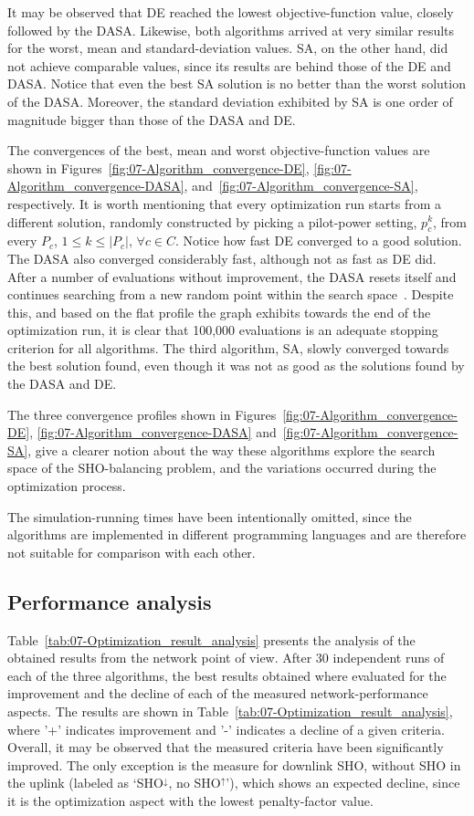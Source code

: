 It may be observed that DE reached the lowest objective-function value,
closely followed by the DASA. Likewise, both algorithms arrived at
very similar results for the worst, mean and standard-deviation values.
SA, on the other hand, did not achieve comparable values, since its
results are behind those of the DE and DASA. Notice that even the
best SA solution is no better than the worst solution of the DASA.
Moreover, the standard deviation exhibited by SA is one order of magnitude
bigger than those of the DASA and DE.

The convergences of the best, mean and worst objective-function values
are shown in Figures~\ref{fig:07-Algorithm_convergence-DE}, \ref{fig:07-Algorithm_convergence-DASA},
and~\ref{fig:07-Algorithm_convergence-SA}, respectively. It is worth
mentioning that every optimization run starts from a different solution,
randomly constructed by picking a pilot-power setting, $p_{c}^{k}$,
from every $P_{c}$, $1\le k\le|P_{c}|$, $\forall c\in C$. Notice
how fast DE converged to a good solution. The DASA also converged
considerably fast, although not as fast as DE did. After a number
of evaluations without improvement, the DASA resets itself and continues
searching from a new random point within the search space~\cite{korosec2010_DASA}.
Despite this, and based on the flat profile the graph exhibits towards
the end of the optimization run, it is clear that 100,000 evaluations
is an adequate stopping criterion for all algorithms. The third algorithm,
SA, slowly converged towards the best solution found, even though
it was not as good as the solutions found by the DASA and DE.

The three convergence profiles shown in Figures~\ref{fig:07-Algorithm_convergence-DE},
\ref{fig:07-Algorithm_convergence-DASA} and~\ref{fig:07-Algorithm_convergence-SA},
give a clearer notion about the way these algorithms explore the search
space of the SHO-balancing problem, and the variations occurred during
the optimization process.

The simulation-running times have been intentionally omitted, since
the algorithms are implemented in different programming languages
and are therefore not suitable for comparison with each other.


\subsection{Performance analysis}

Table~\ref{tab:07-Optimization_result_analysis} presents the analysis
of the obtained results from the network point of view. After 30 independent
runs of each of the three algorithms, the best results obtained where
evaluated for the improvement and the decline of each of the measured
network-performance aspects. The results are shown in Table~\ref{tab:07-Optimization_result_analysis},
where '+' indicates improvement and '-' indicates a decline of a given
criteria. Overall, it may be observed that the measured criteria have
been significantly improved. The only exception is the measure for
downlink SHO, without SHO in the uplink (labeled as `SHO$^{\downarrow}$,
no SHO$^{\uparrow}$'), which shows an expected decline, since it
is the optimization aspect with the lowest penalty-factor value.

